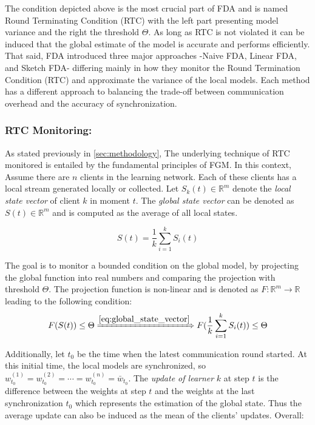 The condition depicted above is the most crucial part of FDA and is named Round Terminating Condition (RTC) with the left part presenting
model variance and the right the threshold $\Theta$. As long as RTC is not violated it can be induced that the global estimate of the model
is accurate and performs efficiently. That said, FDA introduced three major approaches -Naive FDA, Linear FDA, and Sketch FDA-
differing mainly in how they monitor the Round Termination Condition (RTC) and approximate the variance of the local models.
Each method has a different approach to balancing the trade-off between communication overhead and the accuracy of synchronization.

\subsubsection{RTC Monitoring:}
As stated previously in \cref{sec:methodology}, The underlying technique of RTC monitored is entailed by the fundamental principles
of FGM\cite{samoladasFunctionalGeometricMonitoring2019}. In this context, Assume there are $n$ clients in the learning network. Each
of these clients has a local stream generated locally or collected. Let \( S_k(t) \in \mathbb{R}^m \) denote the \emph{local state vector} of client
$k$ in moment $t$. The \emph{global state vector} can be denoted as \( S(t) \in \mathbb{R}^m \) and is computed as the average of all local states.

\begin{equation}
    S(t) = \frac{1}{k}\sum_{i=1}^{k}S_i(t)
    \label{eq:global_state_vector}
\end{equation}

\noindent
The goal is to monitor a bounded condition on the global model, by projecting the global function into real numbers and comparing the projection with threshold $\Theta$.
The projection function is non-linear and is denoted as $F :\mathbb{R}^m \rightarrow \mathbb{R}$ leading to the following condition:
\begin{equation}
    \label{eq:objective}
    F(S(t)) \leq \Theta \xRightarrow{\ref{eq:global_state_vector}} F(\frac{1}{k}\sum_{i=1}^{k}S_i(t)) \leq \Theta
\end{equation}

\noindent
Additionally, let \( t_0 \) be the time when the latest communication round started. At this initial time, the local models are synchronized,
so \( w_{t_0}^{(1)} = w_{t_0}^{(2)} = \cdots = w_{t_0}^{(n)} = \bar{w}_{t_0} \). The \emph{update of learner} \( k \) at step \( t \)
is the difference between the weights at step \( t \) and the weights at the last synchronization \( t_0 \) which represents the
estimation of the global state. Thus the average update can also be induced as the mean of the clients' updates. Overall:

